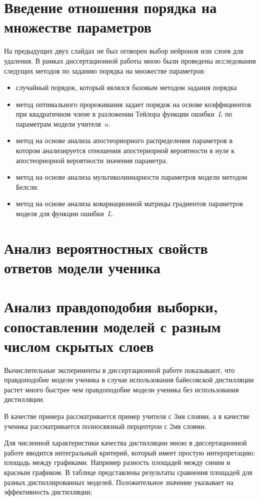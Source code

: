\documentclass[12pt, twoside]{article}
\begin{document}
\section{Введение отношения порядка на множестве параметров}
На предыдущих двух слайдах не был оговорен выбор нейронов или слоев для удаления. В рамках диссертационной работы мною были проведены исследования следущих методов по заданию порядка на множестве параметров:
\begin{itemize}
    \item случайный порядок, который являлся базовым методом задания порядка
    \item метод оптимального прореживания задает порядок на основе коэффициентов при квадратичном члене в разложении Тейлора функции ошибки~$L$ по параметрам модели учителя~$u$.
    \item метод на основе анализа апостеориорного распределения параметров в котором анализируется отношения апостериорной вероятности в нуле к апостеориорной вероятности значения параметра.
    \item метод на основе анализа мультиколиниарности параметров модели методом Белсли.
    \item метод на основе анализа ковариационной матрицы градиентов параметров моделя для функции ошибки~$L$.
\end{itemize}
\section{Анализ вероятностных свойств ответов модели ученика}
\section{Анализ правдоподобия выборки, сопоставлении моделей с разным числом скрытых слоев}

Вычислительные эксперименты в диссертационной работе показывают, что правдоподобие модели ученика в случае использования байесовской дистилляции растет много быстрее чем правдоподобие модели ученика без использования дистилляции.

В качестве примера рассматривается пример учителя с 3мя слоями, а в качестве ученика рассматривается полносвязный перцептрон с 2мя слоями.

Для численной характеристики качества дистилляции мною в диссертационной работе вводится интегральный критерий, который имеет простую интерпретацию: площадь между графиками. Например разность площадей между синим и красным графиком. В таблице представлены результаты сравнения площадей для разных дистиллированных моделей. Положительное значение указывает на эффективность дистилляции;
\end{document}
